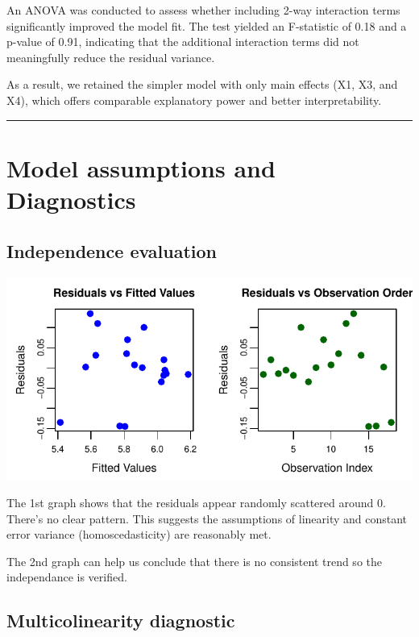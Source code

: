 \documentclass[
  11pt,
]{article}
\begin{document}
An ANOVA was conducted to assess whether including 2-way interaction
terms significantly improved the model fit. The test yielded an
F-statistic of 0.18 and a p-value of 0.91, indicating that the
additional interaction terms did not meaningfully reduce the residual
variance.

As a result, we retained the simpler model with only main effects (X1,
X3, and X4), which offers comparable explanatory power and better
interpretability.

\begin{center}\rule{0.5\linewidth}{0.5pt}\end{center}

\section{Model assumptions and
Diagnostics}\label{model-assumptions-and-diagnostics}

\subsection{Independence evaluation}\label{independence-evaluation}

\includegraphics{Figs/unnamed-chunk-19-1.pdf}

The 1st graph shows that the residuals appear randomly scattered around
0. There's no clear pattern. This suggests the assumptions of linearity
and constant error variance (homoscedasticity) are reasonably met.

The 2nd graph can help us conclude that there is no consistent trend so
the independance is verified.

\subsection{Multicolinearity
diagnostic}\label{multicolinearity-diagnostic}
\end{document}
